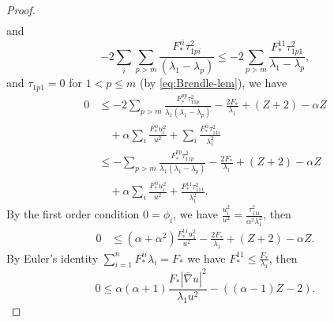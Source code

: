 \documentclass[reqno]{amsart}
\theoremstyle{remark}
\newcommand{\bnabla}{\overline{\nabla}}
\theoremstyle{definition}
\numberwithin{equation}{section}
\begin{document}
\begin{proof}
\[\begin{aligned}
    \end{aligned} \]
    and 
    \[ - 2\sum_i\sum_{p>m}\frac{F_*^{ii}\tau_{1pi}^2}{(\lambda_1 - \lambda_p)} \leq -2\sum_{p>m}\frac{F_*^{11}\tau_{1p1}^2}{\lambda_1 - \lambda_p}, \]
    and \( \tau_{1p1} = 0\) for \(1 < p \leq m\) (by \eqref{eq:Brendle-lem}), we have 
    \[ \begin{aligned}
            0 &\leq -2\sum_{p>m}\frac{F_*^{pp}\tau_{11p}^2}{\lambda_1(\lambda_1 - \lambda_p)} - \frac{2F_*}{\lambda_1} + (Z+2) - \alpha Z  \\
            &\quad + \alpha \sum_i \frac{F_*^{ii}u_i^2}{u^2}  + \sum_i \frac{F_*^{ii}\tau_{11i}^2}{\lambda_1^2} \\
            &\leq -\sum_{p>m}\frac{F_*^{pp}\tau_{11p}^2}{\lambda_1(\lambda_1 - \lambda_p)} - \frac{2F_*}{\lambda_1} + (Z+2) - \alpha Z  \\
            &\quad + \alpha \sum_i \frac{F_*^{ii}u_i^2}{u^2} + \frac{F_*^{11}\tau_{111}^2}{\lambda_1^2}.
    \end{aligned} \]
    By the first order condition \( 0 = \phi_i\), we have \(\frac{u_i^2}{u^2} = \frac{\tau_{11i}^2}{\alpha^2 \lambda_1^2}\), then 
    \[ \begin{aligned}
            0 &\leq  (\alpha + \alpha^2) \frac{F_*^{11}u_1^2}{u^2} -\frac{2F_*}{\lambda_1} + (Z+2)-\alpha Z.
    \end{aligned} \]
    By Euler's identity \(\sum_{i=1}^{n}F_*^{ii}\lambda_i = F_*\) we have \(F_*^{11} \leq \frac{F_*}{\lambda_1}\), then
    \[ 0 \leq \alpha(\alpha+1)\frac{F_*|\bnabla u|^2}{\lambda_1 u^2} - ((\alpha-1)Z - 2). \]


\end{proof}
\end{document}
